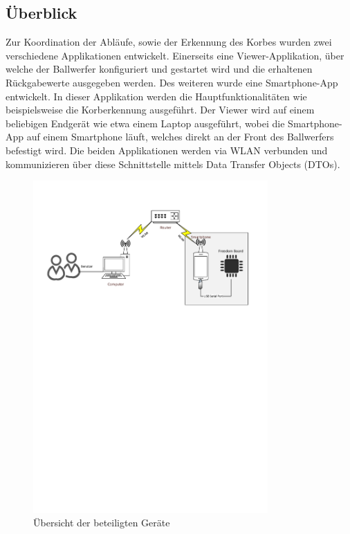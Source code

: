 \subsection{Überblick}
Zur Koordination der Abläufe, sowie der Erkennung des Korbes wurden zwei verschiedene Applikationen entwickelt. Einerseits eine Viewer-Applikation, über welche der Ballwerfer konfiguriert und gestartet wird und die erhaltenen Rückgabewerte ausgegeben werden. Des weiteren wurde eine Smartphone-App entwickelt. In dieser Applikation werden die Hauptfunktionalitäten wie beispielsweise die Korberkennung ausgeführt. Der Viewer wird auf einem beliebigen Endgerät wie etwa einem Laptop ausgeführt, wobei die Smartphone-App auf einem Smartphone läuft, welches direkt an der Front des Ballwerfers befestigt wird. Die beiden Applikationen werden via WLAN verbunden und kommunizieren über diese Schnittstelle mittels Data Transfer Objects (DTOs).

\begin{figure}[h!]
	\includegraphics[width=0.8\textwidth,clip,trim=12mm 180mm 15mm 20mm]
	{Enddokumentation/Bilder/Kommunikation_PREN2_v1.pdf}
	\centering
	\caption{Übersicht der beteiligten Geräte}
	\label{abb:UebersichtKommunikation}
\end{figure}

